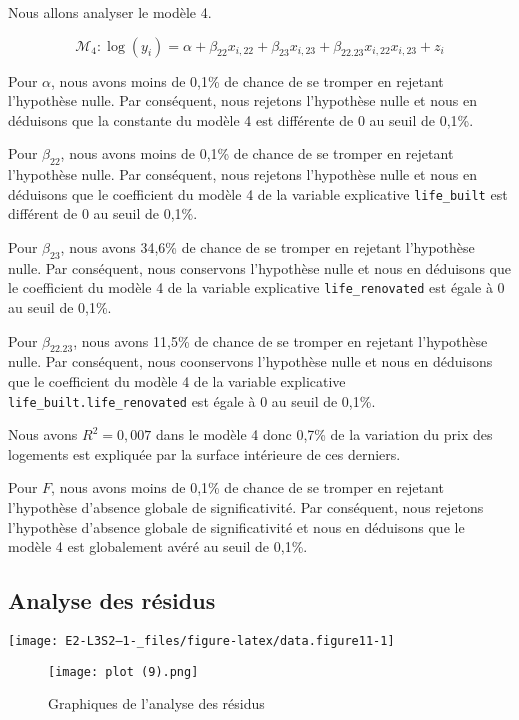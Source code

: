 \documentclass[
  11pt,
  french,
]{article}
\begin{document}
Nous allons analyser le modèle 4.

\[\mathcal{M}_{4}:\log(y_{i})=\alpha+\beta_{22}x_{i,22}+\beta_{23}x_{i,23}+\beta_{22.23}x_{i,22}x_{i,23}+z_{i}\]

Pour \(\alpha\), nous avons moins de 0,1\% de chance de se tromper en
rejetant l'hypothèse nulle. Par conséquent, nous rejetons l'hypothèse
nulle et nous en déduisons que la constante du modèle 4 est différente
de 0 au seuil de 0,1\%.

Pour \(\beta_{22}\), nous avons moins de 0,1\% de chance de se tromper
en rejetant l'hypothèse nulle. Par conséquent, nous rejetons l'hypothèse
nulle et nous en déduisons que le coefficient du modèle 4 de la variable
explicative \texttt{life\_built} est différent de 0 au seuil de 0,1\%.

Pour \(\beta_{23}\), nous avons 34,6\% de chance de se tromper en
rejetant l'hypothèse nulle. Par conséquent, nous conservons l'hypothèse
nulle et nous en déduisons que le coefficient du modèle 4 de la variable
explicative \texttt{life\_renovated} est égale à 0 au seuil de 0,1\%.

Pour \(\beta_{22.23}\), nous avons 11,5\% de chance de se tromper en
rejetant l'hypothèse nulle. Par conséquent, nous coonservons l'hypothèse
nulle et nous en déduisons que le coefficient du modèle 4 de la variable
explicative \texttt{life\_built.life\_renovated} est égale à 0 au seuil
de 0,1\%.

Nous avons \(R^{2}=0,007\) dans le modèle 4 donc 0,7\% de la variation
du prix des logements est expliquée par la surface intérieure de ces
derniers.

Pour \(F\), nous avons moins de 0,1\% de chance de se tromper en
rejetant l'hypothèse d'absence globale de significativité. Par
conséquent, nous rejetons l'hypothèse d'absence globale de
significativité et nous en déduisons que le modèle 4 est globalement
avéré au seuil de 0,1\%.

\newpage

\hypertarget{analyse-des-ruxe9sidus-5}{%
\subsection{Analyse des résidus}\label{analyse-des-ruxe9sidus-5}}

\begin{center}\texttt{[image: E2-L3S2--1-\_files/figure-latex/data.figure11-1]} \end{center}

\begin{figure}
\centering
\texttt{[image: plot (9).png]}
\caption{Graphiques de l'analyse des résidus}
\end{figure}
\end{document}
